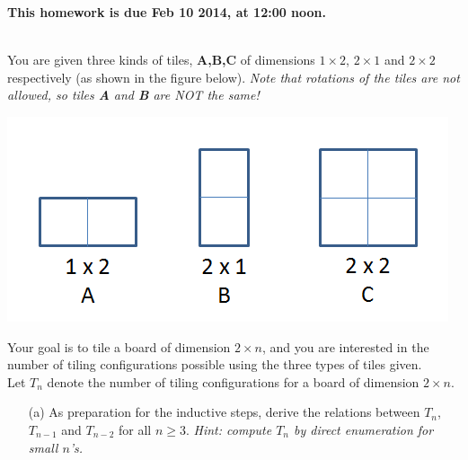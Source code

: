 \documentclass[11pt]{article}
\begin{document}
\maketitle

\vspace{0.5em}
{\Large{\textbf{This homework is due Feb 10 2014, at 12:00 noon.}}}


\begin{qunlist}

 \\
You are given three kinds of tiles, \textbf{A,B,C} of dimensions $1 \times 2$, $2 \times 1$
and $2 \times 2$ respectively (as shown in the figure below).
\textit{Note that rotations of the tiles are not allowed, so tiles \textbf{A} and \textbf{B} are NOT the same!}

\begin{minipage}{\linewidth}
\centering
\includegraphics[scale=0.6]{resources/figures/tile.png}
\end{minipage}

Your goal is to tile a board of dimension $2 \times n$, and you are interested in the number of
tiling configurations possible using the three types of tiles given. \\
Let $T_n$ denote the number of tiling configurations for a board of dimension $2 \times n$.
\begin{itemize}
\item[(a)] As preparation for the inductive steps, derive the relations between $T_n$, $T_{n-1}$ 
and $T_{n-2}$ for all $n \geq 3$. \textit{Hint: compute $T_n$ by direct enumeration for small $n$'s.}


\end{itemize}
\end{qunlist}
\end{document}
